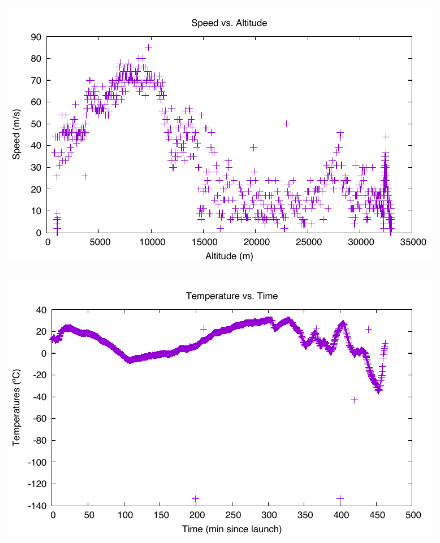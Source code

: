 \documentclass[english]{report}
\begin{document}
\begin{figure}[H]
\begin{centering}
\includegraphics{./tracksoar/speed-altitude}
\par\end{centering}
\caption{}
\label{ts:speed-altitude}
\end{figure}

\begin{figure}[H]
\begin{centering}
\includegraphics{./tracksoar/temp-time}
\par\end{centering}
\caption{}
\label{ts:temp-time}
\end{figure}
\end{document}
